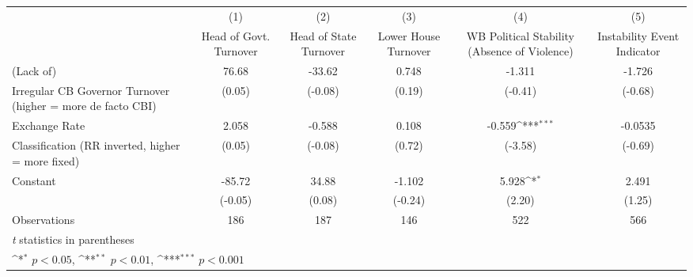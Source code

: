 {
\def\sym#1{\ifmmode^{#1}\else\(^{#1}\)\fi}
\begin{tabular}{l*{5}{c}}
\toprule
                &\multicolumn{1}{c}{(1)}&\multicolumn{1}{c}{(2)}&\multicolumn{1}{c}{(3)}&\multicolumn{1}{c}{(4)}&\multicolumn{1}{c}{(5)}\\
                &\multicolumn{1}{c}{Head of Govt. Turnover}&\multicolumn{1}{c}{Head of State Turnover}&\multicolumn{1}{c}{Lower House Turnover}&\multicolumn{1}{c}{WB Political Stability (Absence of Violence)}&\multicolumn{1}{c}{Instability Event Indicator}\\
\midrule
(Lack of)       &    76.68         &   -33.62         &    0.748         &   -1.311         &   -1.726         \\
Irregular CB Governor Turnover (higher = more de facto CBI)&   (0.05)         &  (-0.08)         &   (0.19)         &  (-0.41)         &  (-0.68)         \\
\addlinespace
Exchange Rate   &    2.058         &   -0.588         &    0.108         &   -0.559\sym{***}&  -0.0535         \\
Classification (RR inverted, higher = more fixed)&   (0.05)         &  (-0.08)         &   (0.72)         &  (-3.58)         &  (-0.69)         \\
\addlinespace
Constant        &   -85.72         &    34.88         &   -1.102         &    5.928\sym{*}  &    2.491         \\
                &  (-0.05)         &   (0.08)         &  (-0.24)         &   (2.20)         &   (1.25)         \\
\midrule
Observations    &      186         &      187         &      146         &      522         &      566         \\
\bottomrule
\multicolumn{6}{l}{\footnotesize \textit{t} statistics in parentheses}\\
\multicolumn{6}{l}{\footnotesize \sym{*} \(p<0.05\), \sym{**} \(p<0.01\), \sym{***} \(p<0.001\)}\\
\end{tabular}
}
